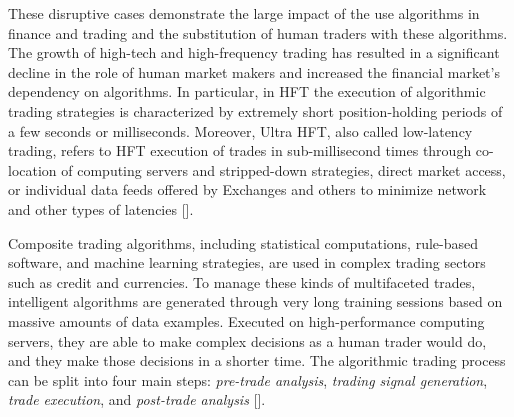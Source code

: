 These disruptive cases demonstrate the large impact of the use algorithms in finance and trading and the substitution of human traders with these algorithms. The growth of high-tech and high-frequency trading has resulted in a significant decline in the role of human market makers and increased the financial market's dependency on algorithms. In particular, in HFT the execution of algorithmic trading strategies is characterized by extremely short position-holding periods of a few seconds or milliseconds. Moreover, Ultra HFT, also called low-latency trading, refers to HFT execution of trades in sub-millisecond times through co-location of computing servers and stripped-down strategies, direct market access, or individual data feeds offered by Exchanges and others to minimize network and other types of latencies [\citealt{chap:6:Treleavenetal:2013}].

Composite trading algorithms, including statistical computations, rule-based software, and machine learning strategies, are used in complex trading sectors such as credit and currencies. To manage these kinds of multifaceted trades, intelligent algorithms are generated through very long training sessions based on massive amounts of data examples. Executed on high-performance computing servers, they are able to make complex decisions as a human trader would do, and they make those decisions in a shorter time. The algorithmic trading process can be split into four main steps: \textit{pre-trade analysis}, \textit{trading signal generation}, \textit{trade execution}, and \textit{post-trade analysis} [\citealt{chap:6:Nutietal:2011}].

